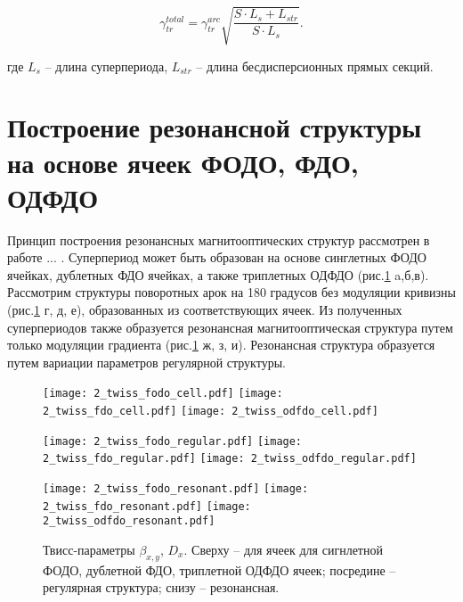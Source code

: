 \begin{equation}
\gamma_{tr}^{total}=\gamma_{tr}^{arc}\sqrt{\frac{S\cdot L_s+L_{str}}{S\cdot L_s}}.
\label {eq:gamma_tr_modulated}
\end{equation}

\noindent где $L_s$ -- длина суперпериода, $L_{str}$ -- длина бесдисперсионных прямых секций.

	\section{Построение резонансной структуры на основе ячеек ФОДО, ФДО, ОДФДО}\label{sec:transition_variation/methods/FODO_FDO}
	
\par Принцип построения резонансных магнитооптических структур рассмотрен в работе ... .
Суперпериод может быть образован на основе синглетных ФОДО ячейках, дублетных ФДО ячейках, а также триплетных ОДФДО (рис.\ref{fig:fodo_fdo_odfdo} a,б,в). Рассмотрим структуры поворотных арок на 180 градусов без модуляции кривизны (рис.\ref{fig:fodo_fdo_odfdo} г, д, е), образованных из соответствующих ячеек. Из полученных суперпериодов также образуется резонансная магнитооптическая структура путем только модуляции градиента (рис.\ref{fig:fodo_fdo_odfdo} ж, з, и). Резонансная структура образуется путем вариации параметров регулярной структуры.

\begin{figure} [h!]

   \texttt{[image: 2\_twiss\_fodo\_cell.pdf]}
   \texttt{[image: 2\_twiss\_fdo\_cell.pdf]}
   \texttt{[image: 2\_twiss\_odfdo\_cell.pdf]}

   \texttt{[image: 2\_twiss\_fodo\_regular.pdf]}
   \texttt{[image: 2\_twiss\_fdo\_regular.pdf]}
   \texttt{[image: 2\_twiss\_odfdo\_regular.pdf]}

   \texttt{[image: 2\_twiss\_fodo\_resonant.pdf]}
   \texttt{[image: 2\_twiss\_fdo\_resonant.pdf]}
   \texttt{[image: 2\_twiss\_odfdo\_resonant.pdf]}

   \caption{Твисс-параметры $\beta_{x,y}$, $D_{x}$. Сверху -- для ячеек для сигнлетной ФОДО, дублетной ФДО, триплетной ОДФДО ячеек; посредине -- регулярная структура; снизу -- резонансная.}
   \label{fig:fodo_fdo_odfdo}
\end{figure}

